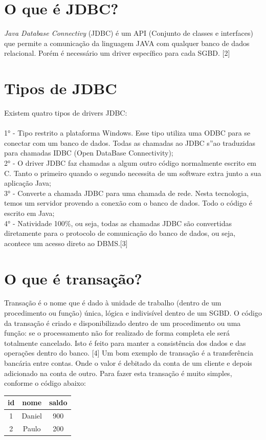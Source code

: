 \documentclass[12pt,a4paper]{article}
\begin{document}
\section{O que é JDBC? }
\textit{Java Database Connectivy} (JDBC) é um API (Conjunto de classes e interfaces) que permite a comunicação da linguagem JAVA com qualquer banco de dados relacional. Porém é necessário um driver específico para cada SGBD.  [2]
\section{Tipos de JDBC}
\hspace{-0.7 cm}
Existem quatro tipos de drivers JDBC:
\\
\\
1° - Tipo restrito a plataforma Windows. Esse tipo utiliza uma ODBC para se conectar com um banco de dados. Todas as chamadas ao JDBC s”ao traduzidas para chamadas IDBC (Open DataBase Connectivity);
\\
2° - O driver JDBC faz chamadas a algum outro código normalmente escrito em C.  Tanto o primeiro quando o segundo necessita de um software extra junto a sua aplicação Java;
\\
3° - Converte a chamada JDBC para uma chamada de rede. Nesta tecnologia, temos um servidor provendo a conexão com o banco de dados. Todo o código é escrito em Java;
\\
4° - Natividade 100\%, ou seja, todas as chamadas JDBC são convertidas diretamente para o protocolo de comunicação do banco de dados, ou seja, acontece um acesso direto ao DBMS.[3]
\section{O que é transação? }
Transação é o nome que é dado à unidade de trabalho (dentro de um procedimento ou função) única, lógica e indivisível dentro de um SGBD. O código da transação é criado e disponibilizado dentro de um procedimento ou uma função: se o processamento não for realizado de forma completa ele será totalmente cancelado. Isto é feito para manter a consistência dos dados e das operações dentro do banco. [4]
Um bom exemplo de transação é a transferência bancária entre contas. Onde o valor é debitado da conta de um cliente e depois adicionado na conta de outro. 
Para fazer esta transação é muito simples, conforme o código abaixo:
\begin{center}
\begin{tabular}{|c|c|c|}
\hline 
id & nome & saldo \\ 
\hline 
1 & Daniel & 900 \\ 
\hline 
2 & Paulo & 200 \\ 
\hline 
\end{tabular} 
\end{center}
 
 
\end{document}
